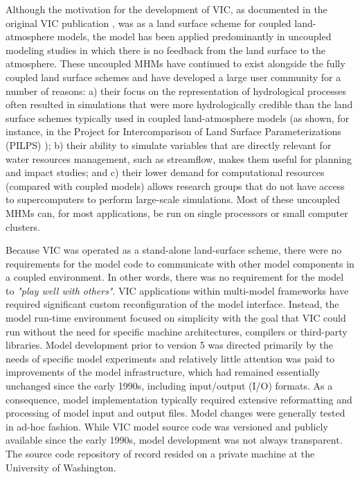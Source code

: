 \documentclass[gmd, manuscript]{copernicus}
\begin{document}
  Although the motivation for the development of VIC, as documented in the original VIC publication \citep{Liang_1994}, was as a land surface scheme for coupled land-atmosphere models, the model has been applied predominantly in uncoupled modeling studies in which there is no feedback from the land surface to the atmosphere. These uncoupled MHMs have continued to exist alongside the fully coupled land surface schemes and have developed a large user community for a number of reasons: a) their focus on the representation of hydrological processes often resulted in simulations that were more hydrologically credible than the land surface schemes typically used in coupled land-atmosphere models (as shown, for instance, in the Project for Intercomparison of Land Surface Parameterizations (PILPS) \citep{Bowling_2003,wood_1998}); b) their ability to simulate variables that are directly relevant for water resources management, such as streamflow, makes them useful for planning and impact studies; and c) their lower demand for computational resources (compared with coupled models) allows research groups that do not have access to supercomputers to perform large-scale simulations. Most of these uncoupled MHMs can, for most applications, be run on single processors or small computer clusters.

  Because VIC was operated as a stand-alone land-surface scheme, there were no requirements for the model code to communicate with other model components in a coupled environment. In other words, there was no requirement for the model to \textit{"play well with others"}.  VIC applications within multi-model frameworks \citep[e.g. NASA LIS, ][]{Kumar_2006} have  required significant custom reconfiguration of the model interface. Instead, the model run-time environment focused on simplicity with the goal that VIC could run without the need for specific machine architectures, compilers or third-party libraries. Model development prior to version 5 was directed primarily by the needs of specific model experiments and relatively little attention was paid to improvements of the model infrastructure, which had remained essentially unchanged since the early 1990s, including input/output (I/O) formats. As a consequence, model implementation typically required extensive reformatting and processing of model input and output files. Model changes were generally tested in ad-hoc fashion. While VIC model source code was versioned and publicly available since the early 1990s, model development was not always transparent. The source code repository of record resided on a private machine at the University of Washington.
\end{document}
